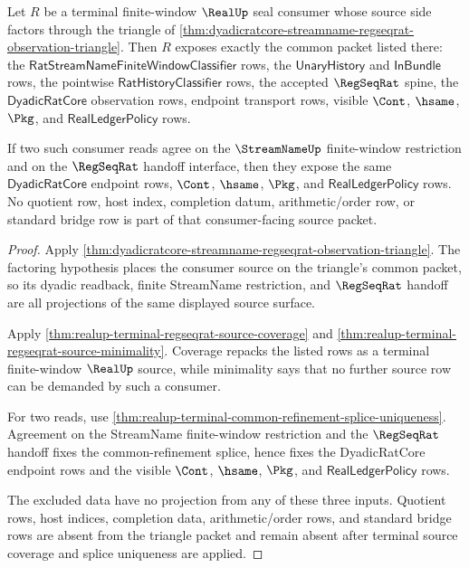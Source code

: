 \begin{theorem}
\label{thm:realup-dyadic-streamname-observation-triangle-consumer}
Let $R$ be a terminal finite-window $\RealUp$ seal consumer whose source side
factors through the triangle of
\autoref{thm:dyadicratcore-streamname-regseqrat-observation-triangle}. Then
$R$ exposes exactly the common packet listed there: the
$\mathsf{RatStreamNameFiniteWindowClassifier}$ rows, the
$\mathsf{UnaryHistory}$ and $\mathsf{InBundle}$ rows, the pointwise
$\mathsf{RatHistoryClassifier}$ rows, the accepted $\RegSeqRat$ spine, the
$\mathsf{DyadicRatCore}$ observation rows, endpoint transport rows, visible
$\Cont$, $\hsame$, $\Pkg$, and $\mathsf{RealLedgerPolicy}$ rows.

If two such consumer reads agree on the $\StreamNameUp$ finite-window
restriction and on the $\RegSeqRat$ handoff interface, then they expose the
same $\mathsf{DyadicRatCore}$ endpoint rows, $\Cont$, $\hsame$, $\Pkg$, and
$\mathsf{RealLedgerPolicy}$ rows. No quotient row, host index, completion
datum, arithmetic/order row, or standard bridge row is part of that
consumer-facing source packet.
\end{theorem}
\begin{proof}
Apply
\autoref{thm:dyadicratcore-streamname-regseqrat-observation-triangle}. The
factoring hypothesis places the consumer source on the triangle's common
packet, so its dyadic readback, finite StreamName restriction, and
$\RegSeqRat$ handoff are all projections of the same displayed source surface.

Apply \autoref{thm:realup-terminal-regseqrat-source-coverage} and
\autoref{thm:realup-terminal-regseqrat-source-minimality}. Coverage repacks the
listed rows as a terminal finite-window $\RealUp$ source, while minimality says
that no further source row can be demanded by such a consumer.

For two reads, use
\autoref{thm:realup-terminal-common-refinement-splice-uniqueness}. Agreement on
the StreamName finite-window restriction and the $\RegSeqRat$ handoff fixes the
common-refinement splice, hence fixes the DyadicRatCore endpoint rows and the
visible $\Cont$, $\hsame$, $\Pkg$, and $\mathsf{RealLedgerPolicy}$ rows.

The excluded data have no projection from any of these three inputs. Quotient
rows, host indices, completion data, arithmetic/order rows, and standard bridge
rows are absent from the triangle packet and remain absent after terminal
source coverage and splice uniqueness are applied.
\end{proof}

